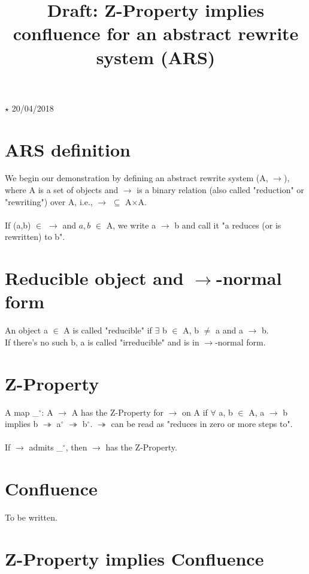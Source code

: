 \documentclass[]{article}
\title{Draft: Z-Property implies confluence for an abstract rewrite system (ARS)}
\author{}
\date{}
\begin{document}
	
\maketitle	

$\star$  20/04/2018
	
	


\section{ARS definition}
We begin our demonstration by defining an abstract rewrite system (A, $\rightarrow$), where A is a set of objects and $\rightarrow$ is a binary relation (also called "reduction" or "rewriting") over A, i.e., $\rightarrow$ $\subseteq$ A$\times$A. \\\\If (a,b) $\in$ $\rightarrow$ and $a, b$ $\in$ A, we write a $\rightarrow$ b and call it "a reduces (or is rewritten) to b".

\section{Reducible object and $\rightarrow$-normal form}
An object a $\in$ A is called "reducible" if $\exists$ b $\in$ A, b $\ne$ a and a $\rightarrow$ b. \\ If there's no such b, a is called "irreducible" and is in $\rightarrow$-normal form.

\section{Z-Property}
A map \_$^{\circ}$: A $\rightarrow$ A has the Z-Property for $\rightarrow$ on A if $\forall$ a, b $\in$ A, a $\rightarrow$ b implies b $\twoheadrightarrow$ a$^{\circ}$ $\twoheadrightarrow$ b$^{\circ}$. $\twoheadrightarrow$ can be read as "reduces in zero or more steps to". \\\\
If $\rightarrow$ admits \_$^{\circ}$, then $\rightarrow$ has the Z-Property.

\section{Confluence}
To be written.

\section{Z-Property implies Confluence}
\end{document}
